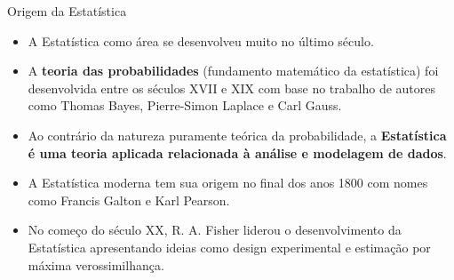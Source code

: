 \documentclass[
  ignorenonframetext,
  serif,
  professionalfont,
  usenames,
  dvipsnames,
  aspectratio = 169]{beamer}
\begin{document}
\begin{frame}{Origem da Estatística}
\label{origem-da-estatuxedstica-1}
\begin{itemize}
\item
  A Estatística como área se desenvolveu muito no último século.
\item
  A \textbf{teoria das probabilidades} (fundamento matemático da
  estatística) foi desenvolvida entre os séculos XVII e XIX com base no
  trabalho de autores como Thomas Bayes, Pierre-Simon Laplace e Carl
  Gauss.
\item
  Ao contrário da natureza puramente teórica da probabilidade, a
  \textbf{Estatística é uma teoria aplicada relacionada à análise e modelagem de dados}.
\item
  A Estatística moderna tem sua origem no final dos anos 1800 com nomes
  como Francis Galton e Karl Pearson.
\item
  No começo do século XX, R. A. Fisher liderou o desenvolvimento da
  Estatística apresentando ideias como design experimental e estimação
  por máxima verossimilhança.
\end{itemize}
\end{frame}
\end{document}
